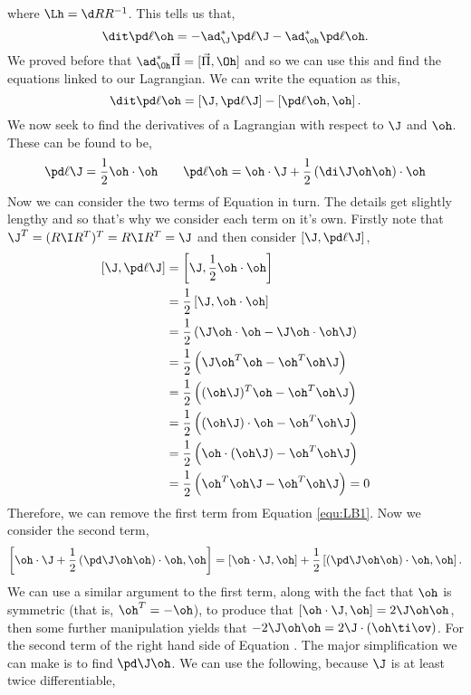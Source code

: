 where $\Lh = \d R R^{-1}$. This tells us that,
$$ \dit\pd \ell \oh = -\ad^*_\J \pd \ell \J - \ad^*_{\oh} \pd \ell \oh. $$
We proved before that $\ad^*_{\Oh}\vec\Pi = [\vec\Pi, \Oh]$ and so we can use this and find the equations linked to our Lagrangian. We can write the equation as this,
\begin{equation}
  \dit\pd \ell \oh = \left[\J, \pd \ell \J\right] - \left[\pd \ell \oh, \oh\right].\label{equ:LB1}
\end{equation}
We now seek to find the derivatives of a Lagrangian with respect to $\J$ and $\oh$. These can be found to be,
$$ \pd \ell \J = \frac{1}{2}\oh \cdot \oh \qquad \pd \ell \oh = \oh \cdot \J + \frac{1}{2}\left( \di \J \oh \oh \right) \cdot \oh $$
Now we can consider the two terms of Equation  in turn. The details get slightly lengthy and so that's why we consider each term on it's own. Firstly note that $\J^T = (R\I R^T)^T = R\I R^T = \J$ and then consider $\left[ \J, \pd \ell \J \right]$,
\begin{align*}
  \left[ \J, \pd \ell \J \right] &= \left[ \J, \frac{1}{2}\oh \cdot \oh \right]\\
  &= \frac{1}{2}\left[ \J, \oh \cdot \oh \right]\\
  &= \frac{1}{2}\left(\J\oh \cdot \oh - \J\oh \cdot \oh\J \right)\\
  &= \frac{1}{2}\left(\J\oh^T \oh - \oh^T \oh\J \right)\\
  &= \frac{1}{2}\left((\oh\J)^T \oh - \oh^T \oh\J \right)\\
  &= \frac{1}{2}\left((\oh\J) \cdot \oh - \oh^T \oh\J \right)\\
  &= \frac{1}{2}\left(\oh \cdot (\oh\J) - \oh^T \oh\J \right)\\
  &= \frac{1}{2}\left(\oh^T\oh\J - \oh^T \oh\J \right) = 0
\end{align*}
Therefore, we can remove the first term from Equation \ref{equ:LB1}. Now we consider the second term,
\begin{equation}
  \left[ \oh \cdot \J + \frac{1}{2}\left( \pd \J \oh \oh \right) \cdot \oh, \oh \right] = \left[ \oh \cdot \J, \oh\right] + \frac{1}{2}\left[\left( \pd \J \oh \oh \right) \cdot \oh, \oh \right].\label{equ:LB2}
\end{equation}
We can use a similar argument to the first term, along with the fact that $\oh$ is symmetric (that is, $\oh^T = -\oh$), to produce that $\left[ \oh \cdot \J, \oh\right] = 2\J \oh \oh$, then some further manipulation yields that $-2\J \oh\oh = 2\J \cdot (\oh \ti \ov)$. For the second term of the right hand side of Equation . The major simplification we can make is to find $\pd \J \oh$. We can use the following, because $\J$ is at least twice differentiable,
